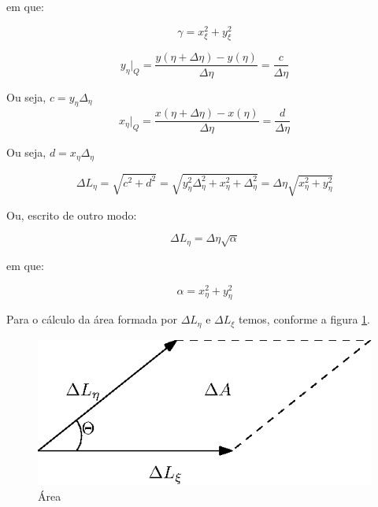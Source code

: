em que:

\begin{equation}
    \label{eq:3.12}
    \gamma = x_\xi^2 + y_\xi^2
\end{equation}

\begin{equation*}
    y_\eta \vert_Q = \frac{y(\eta+\Delta \eta)-y(\eta)}{\Delta \eta} = \frac{c}{\Delta \eta}
\end{equation*}

Ou seja, $c=y_\eta \Delta_\eta$
\begin{equation*}
    x_\eta \vert_Q = \frac{x(\eta+\Delta \eta)-x(\eta)}{\Delta \eta} = \frac{d}{\Delta \eta}
\end{equation*}

Ou seja, $d=x_\eta \Delta_\eta$

\begin{equation*}
    \Delta L_\eta = \sqrt{c^2+d^2} = \sqrt{y_\eta^2 \Delta_\eta^2 + x_\eta^2+\Delta_\eta^2} = \Delta \eta \sqrt{x_\eta^2 + y_\eta^2}
\end{equation*}

Ou, escrito de outro modo:

\begin{equation}
    \label{eq:3.13}
    \Delta L_\eta = \Delta \eta \sqrt{\alpha}
\end{equation}

em que:

\begin{equation}
    \label{eq:3.14}
    \alpha = x_\eta^2 + y_\eta^2
\end{equation}

Para o cálculo da área formada por $\Delta L_\eta$ e $\Delta L_\xi$ temos, conforme a figura \ref{fig:area}.

\begin{figure}[]
    \centering
    \includegraphics{fig/area.eps}
    \caption{Área}
    \label{fig:area}
\end{figure}

